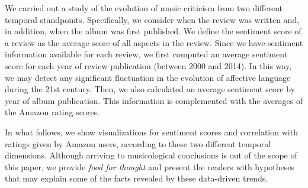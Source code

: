 We carried out a study of the evolution of music criticism from two different temporal standpoints. Specifically, we consider when the review was written and, in addition, when the album was first published. We define the sentiment score of a review as the average score of all aspects in the review. Since we have sentiment information available for each review, we first computed an average sentiment score for each year of review publication (between 2000 and 2014). In this way, we may detect any significant fluctuation in the evolution of affective language during the 21st century. Then, we also calculated an average sentiment score by year of album publication. This information is complemented with the averages of the Amazon rating scores.

In what follows, we show visualizations for sentiment scores and correlation with ratings given by Amazon users, according to these two different temporal dimensions. Although arriving to musicological conclusions is out of the scope of this paper, we provide \textit{food for thought} and present the readers with hypotheses that may explain some of the facts revealed by these data-driven trends.

